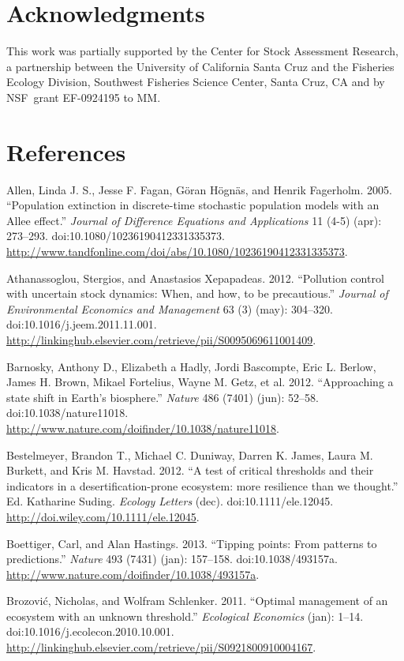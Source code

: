 \documentclass[author-year, review]{elsarticle} %
\begin{document}
\section{Acknowledgments}

This work was partially supported by the Center for Stock Assessment
Research, a partnership between the University of California Santa Cruz
and the Fisheries Ecology Division, Southwest Fisheries Science Center,
Santa Cruz, CA and by NSF~grant EF-0924195 to MM.

\section{References}

Allen, Linda J. S., Jesse F. Fagan, Göran Högnäs, and Henrik Fagerholm.
2005. ``Population extinction in discrete-time stochastic population
models with an Allee effect.'' \emph{Journal of Difference Equations and
Applications} 11 (4-5) (apr): 273--293.
doi:10.1080/10236190412331335373.
\url{http://www.tandfonline.com/doi/abs/10.1080/10236190412331335373}.

Athanassoglou, Stergios, and Anastasios Xepapadeas. 2012. ``Pollution
control with uncertain stock dynamics: When, and how, to be
precautious.'' \emph{Journal of Environmental Economics and Management}
63 (3) (may): 304--320. doi:10.1016/j.jeem.2011.11.001.
\url{http://linkinghub.elsevier.com/retrieve/pii/S0095069611001409}.

Barnosky, Anthony D., Elizabeth a Hadly, Jordi Bascompte, Eric L.
Berlow, James H. Brown, Mikael Fortelius, Wayne M. Getz, et al. 2012.
``Approaching a state shift in Earth's biosphere.'' \emph{Nature} 486
(7401) (jun): 52--58. doi:10.1038/nature11018.
\url{http://www.nature.com/doifinder/10.1038/nature11018}.

Bestelmeyer, Brandon T., Michael C. Duniway, Darren K. James, Laura M.
Burkett, and Kris M. Havstad. 2012. ``A test of critical thresholds and
their indicators in a desertification-prone ecosystem: more resilience
than we thought.'' Ed. Katharine Suding. \emph{Ecology Letters} (dec).
doi:10.1111/ele.12045. \url{http://doi.wiley.com/10.1111/ele.12045}.

Boettiger, Carl, and Alan Hastings. 2013. ``Tipping points: From
patterns to predictions.'' \emph{Nature} 493 (7431) (jan): 157--158.
doi:10.1038/493157a.
\url{http://www.nature.com/doifinder/10.1038/493157a}.

Brozović, Nicholas, and Wolfram Schlenker. 2011. ``Optimal management of
an ecosystem with an unknown threshold.'' \emph{Ecological Economics}
(jan): 1--14. doi:10.1016/j.ecolecon.2010.10.001.
\url{http://linkinghub.elsevier.com/retrieve/pii/S0921800910004167}.
\end{document}

